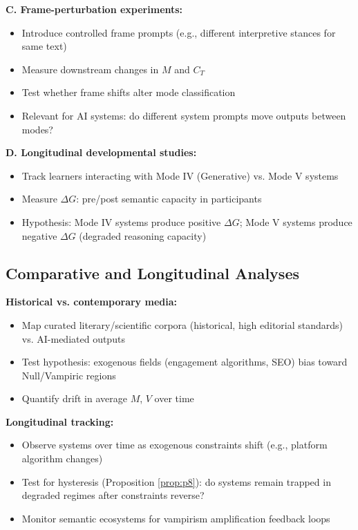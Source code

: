 \documentclass[12pt]{article}
\begin{document}
\textbf{C. Frame-perturbation experiments:}
\begin{itemize}
\item Introduce controlled frame prompts (e.g., different interpretive stances for same text)
\item Measure downstream changes in $M$ and $C_T$
\item Test whether frame shifts alter mode classification
\item Relevant for AI systems: do different system prompts move outputs between modes?
\end{itemize}

\textbf{D. Longitudinal developmental studies:}
\begin{itemize}
\item Track learners interacting with Mode IV (Generative) vs. Mode V systems
\item Measure $\Delta G$: pre/post semantic capacity in participants
\item Hypothesis: Mode IV systems produce positive $\Delta G$; Mode V systems produce negative $\Delta G$ (degraded reasoning capacity)
\end{itemize}

\subsection{Comparative and Longitudinal Analyses}

\textbf{Historical vs. contemporary media:}
\begin{itemize}
\item Map curated literary/scientific corpora (historical, high editorial standards) vs. AI-mediated outputs
\item Test hypothesis: exogenous fields (engagement algorithms, SEO) bias toward Null/Vampiric regions
\item Quantify drift in average $M$, $V$ over time
\end{itemize}

\textbf{Longitudinal tracking:}
\begin{itemize}
\item Observe systems over time as exogenous constraints shift (e.g., platform algorithm changes)
\item Test for hysteresis (Proposition \ref{prop:p8}): do systems remain trapped in degraded regimes after constraints reverse?
\item Monitor semantic ecosystems for vampirism amplification feedback loops
\end{itemize}
\end{document}
